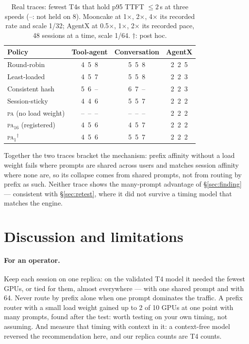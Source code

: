 \documentclass[10pt,twocolumn]{article}
\newcommand{\PA}{\textsc{pa}}
\newcommand{\miss}{--}
\begin{document}
\begin{table}[t]
\centering\small
\caption{Real traces: fewest T4s that hold p95 TTFT $\le 2$\,s at three speeds (\miss: not held on
8). Mooncake at 1$\times$, 2$\times$, 4$\times$ its recorded rate and scale 1/32; AgentX at
0.5$\times$, 1$\times$, 2$\times$ its recorded pace, 48 sessions at a time, scale 1/64. $\dagger$: post
hoc.}
\label{tab:real}
\begin{tabular}{@{}lccc@{}}
\toprule
Policy & Tool-agent & Conversation & AgentX \\
\midrule
Round-robin            & 4\ 5\ 8 & 5\ 5\ 8 & 2\ 2\ 5 \\
Least-loaded           & 4\ 5\ 7 & 5\ 5\ 8 & 2\ 2\ 3 \\
Consistent hash        & 5\ 6\ \miss & 6\ 7\ \miss & 2\ 2\ 3 \\
Session-sticky         & 4\ 4\ 6 & 5\ 5\ 7 & 2\ 2\ 2 \\
\PA{} (no load weight) & \miss\ \miss\ \miss & \miss\ \miss\ \miss & 2\ 2\ 2 \\
\PA$_{16}$ (registered) & 4\ 5\ 6 & 4\ 5\ 7 & 2\ 2\ 2 \\
\PA$_{1}{}^{\dagger}$  & 4\ 5\ 6 & 5\ 5\ 7 & 2\ 2\ 2 \\
\bottomrule
\end{tabular}
\end{table}

Together the two traces bracket the mechanism: prefix affinity without a load weight fails where
prompts are shared across users and matches session affinity where none are, so its collapse comes
from shared prompts, not from routing by prefix as such. Neither trace shows the many-prompt
advantage of \S\ref{sec:finding} --- consistent with \S\ref{sec:retest}, where it did not survive a
timing model that matches the engine.

\section{Discussion and limitations}

\paragraph{For an operator.} Keep each session on one replica: on the validated T4 model it needed the
fewest GPUs, or tied for them, almost everywhere --- with one shared prompt and with 64. Never route by
prefix alone when one prompt dominates the traffic. A prefix router with a small load weight gained up
to 2 of 10 GPUs at one point with many prompts, found after the test: worth testing on your own
timing, not assuming. And measure that timing with context in it: a context-free model reversed the
recommendation here, and our replica counts are T4 counts.
\end{document}
